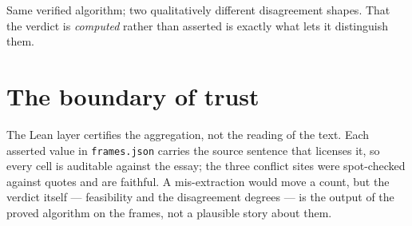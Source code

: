 \documentclass[11pt]{article}
\newcommand{\lean}[1]{\texttt{#1}}
\begin{document}
Same verified algorithm; two qualitatively different disagreement shapes.
That the verdict is \emph{computed} rather than asserted is exactly what
lets it distinguish them.

\section{The boundary of trust}

The Lean layer certifies the aggregation, not the reading of the text. Each
asserted value in \lean{frames.json} carries the source sentence that
licenses it, so every cell is auditable against the essay; the three
conflict sites were spot-checked against quotes and are faithful. A
mis-extraction would move a count, but the verdict itself --- feasibility
and the disagreement degrees --- is the output of the proved algorithm on
the frames, not a plausible story about them.



\end{document}
